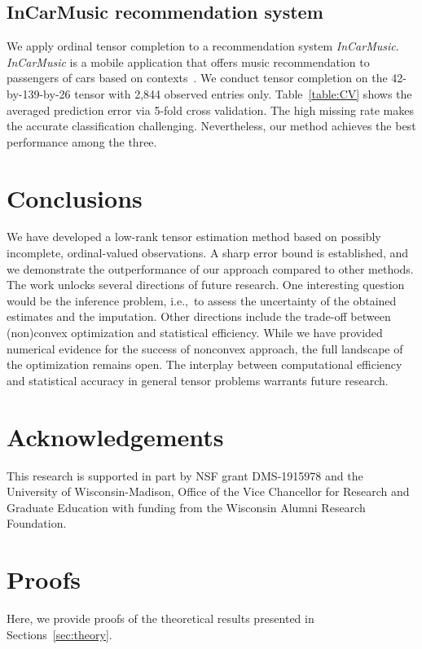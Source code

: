 \documentclass{article}
\theoremstyle{plain}
\theoremstyle{definition}
\begin{document}
\subsection{InCarMusic recommendation system}
We apply ordinal tensor completion to a recommendation system {\it InCarMusic}. {\it InCarMusic} is a mobile application that offers music recommendation to passengers of cars based on contexts~\cite{baltrunas2011incarmusic}. We conduct tensor completion on the 42-by-139-by-26 tensor with 2,844 observed entries only. Table~\ref{table:CV} shows the averaged prediction error via 5-fold cross validation. The high missing rate makes the accurate classification challenging. Nevertheless, our method achieves the best performance among the three.

\section{Conclusions}
We have developed a low-rank tensor estimation method based on possibly incomplete, ordinal-valued observations. A sharp error bound is established, and we demonstrate the outperformance of our approach compared to other methods. The work unlocks several directions of future research. One interesting question would be the inference problem, i.e.,\ to assess the uncertainty of the obtained estimates and the imputation. Other directions include the trade-off between (non)convex optimization and statistical efficiency. While we have provided numerical evidence for the success of nonconvex approach, the full landscape of the optimization remains open. The interplay between computational efficiency and statistical accuracy in general tensor problems warrants future research.

\newpage
\section*{Acknowledgements}
This research is supported in part by NSF grant DMS-1915978 and the University of Wisconsin-Madison, Office of the Vice Chancellor for Research and Graduate Education with funding from the Wisconsin Alumni Research Foundation.





\clearpage
\appendix
\onecolumn


\section{Proofs}\label{sec:proof}
Here, we provide proofs of the theoretical results presented in Sections~\ref{sec:theory}.
\end{document}
